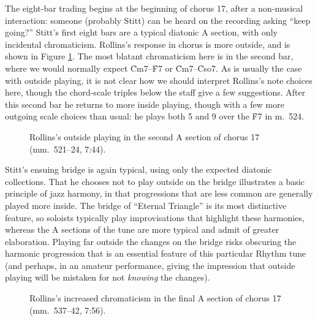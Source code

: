 The eight-bar trading begins at the beginning of chorus 17, after a
non-musical interaction: someone (probably Stitt) can be heard on the
recording asking ``keep going?'' Stitt's first eight bars are a typical
diatonic A section, with only incidental chromaticism. Rollins's response in
chorus  is more outside, and is shown in Figure
\ref{et:sr-outside-17a2}. The most blatant chromaticism here is in the second
bar, where we would normally expect \h{Cm7}--\h{F7} or \h{Cm7}--\h{Cso7}. As
is usually the case with outside playing, it is not clear how we should
interpret Rollins's note choices here, though the chord-scale triples below
the staff give a few suggestions. After this second bar he returns to more
inside playing, though with a few more outgoing scale choices than usual: he
plays both \sharp{}5 and \flat{}9 over the \h{F7} in m.~524.

\begin{figure}[tbp]
  \caption[Rollins's outside playing in the second A section of chorus 17.]{%
    Rollins's outside playing in the second A section of chorus 17
    (mm.~521--24, 7:44).}
  \label{et:sr-outside-17a2}
\end{figure}

Stitt's ensuing bridge is again typical, using only the expected diatonic
collections. That he chooses not to play outside on the bridge illustrates a
basic principle of jazz harmony, in that progressions that are less common are
generally played more inside. The bridge of ``Eternal Triangle'' is its most
distinctive feature, so soloists typically play improvisations that highlight
these harmonies, whereas the A sections of the tune are more typical and admit
of greater elaboration. Playing far outside the changes on the bridge risks
obscuring the harmonic progression that is an essential feature of this
particular Rhythm tune (and perhaps, in an amateur performance, giving the
impression that outside playing will be mistaken for not \emph{knowing} the
changes).

\begin{figure}[tbp]
  \caption[Rollins's increased chromaticism in the final A section of chorus
  17.]{%
    Rollins's increased chromaticism in the final A section of chorus 17
    (mm.~537--42, 7:56).}
  \label{et:sr-outside-17a3}
\end{figure}

